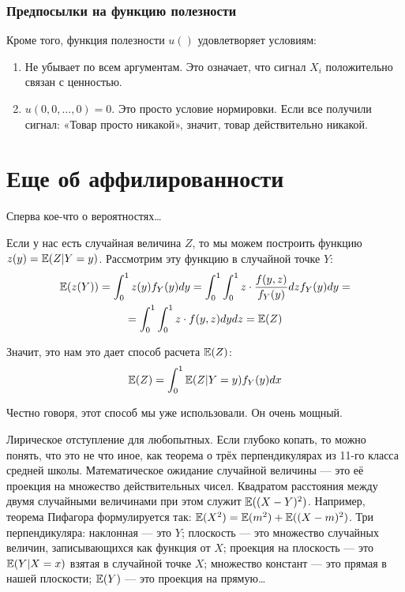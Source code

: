 \subsubsection*{Предпосылки на функцию полезности}
Кроме того, функция полезности $ u() $ удовлетворяет условиям:
\begin{enumerate}
\item Не убывает по всем аргументам. Это означает, что сигнал $ X_{i} $ положительно связан с ценностью.
\item $ u(0,0,\ldots,0)=0 $. Это просто условие нормировки. Если все получили сигнал: «Товар просто никакой», значит, товар действительно никакой.
\end{enumerate}






\section{Еще об аффилированности}


Сперва кое-что о вероятностях\ldots

Если у нас есть случайная величина $ Z $, то мы можем построить функцию $z(y)= \mathbb{E}(Z|Y=y) $. Рассмотрим эту функцию в случайной точке $ Y $:
\begin{multline}
\mathbb{E}(z(Y))=\int_{0}^{1}z(y)f_{Y}(y)dy=\int_{0}^{1}\int_{0}^{1}z\cdot \frac{f(y,z)}{f_{Y}(y)}dz f_{Y}(y)dy=\\
=\int_{0}^{1}\int_{0}^{1}z\cdot f(y,z)dydz=\mathbb{E}(Z)
\end{multline}

Значит, это нам это дает способ расчета $ \mathbb{E}(Z) $:
\begin{equation}
\label{conditional_way}
\mathbb{E}(Z)=\int_{0}^{1}\mathbb{E}(Z|Y=y)f_{Y}(y)dx
\end{equation}

Честно говоря, этот способ мы уже использовали. Он очень мощный.

Лирическое отступление для любопытных. Если глубоко копать, то можно понять, что это не что иное, как теорема о трёх перпендикулярах из 11-го класса средней школы. Математическое ожидание случайной величины — это её проекция на множество действительных чисел. Квадратом расстояния между двумя случайными величинами при этом служит $ \mathbb{E}((X-Y)^{2}) $. Например, теорема Пифагора формулируется так: $ \mathbb{E}(X^{2})=\mathbb{E}(m^{2})+\mathbb{E}((X-m)^{2}) $. Три перпендикуляра: наклонная — это $ Y $; плоскость — это множество случайных величин, записывающихся как функция от $ X $; проекция на плоскость — это $ \mathbb{E}(Y|X=x) $ взятая в случайной точке $ X $; множество констант — это прямая в нашей плоскости; $ \mathbb{E}(Y) $ — это проекция на прямую\ldots


